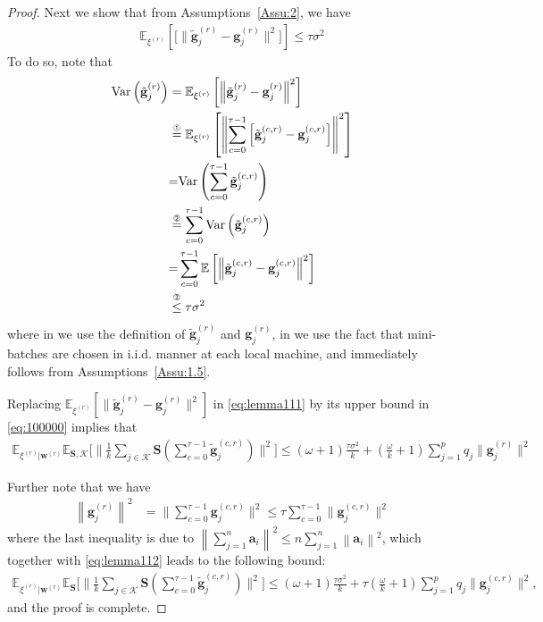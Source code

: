 \documentclass[twoside]{article}
\begin{document}
\begin{proof}
Next we show that from Assumptions~\ref{Assu:2}, we have 
\begin{align}\label{eq:100000}
    \mathbb{E}_{\xi^{(r)}}\left[\Big[\|{\tilde{\mathbf{g}}_j^{(r)}}-{\mathbf{g}_j^{(r)}}\|^2\Big]\right]\leq \tau \sigma^2
\end{align}
To do so, note that 
\begin{align}
    \text{Var}\left(\tilde{\mathbf{g}}_{j}^{(r)}\right)&=\mathbb{E}_{\xi^{(r)}}\left[\left\|{\tilde{\mathbf{g}}_j^{(r)}}-{\mathbf{g}_j^{(r)}}\right\|^2\right]\nonumber\\
    &\stackrel{\text{\ding{192}}}{=}\mathbb{E}_{\xi^{(r)}}\left[\left\|\sum_{c=0}^{\tau-1}\left[\tilde{\mathbf{g}}_j^{(c,r)}-\mathbf{g}_j^{(c,r)}\right]\right\|^2\right]\nonumber\\
    &{=}\text{Var}\left(\sum_{c=0}^{\tau-1}\tilde{\mathbf{g}}_j^{(c,r)}\right)\nonumber\\
    &\stackrel{\text{\ding{193}}}{=}\sum_{c=0}^{\tau-1}\text{Var}\left(\tilde{\mathbf{g}}_j^{(c,r)}\right)\nonumber\\
    &{=}\sum_{c=0}^{\tau-1}\mathbb{E}\left[\left\|\tilde{\mathbf{g}}_j^{(c,r)}-\mathbf{g}_j^{(c,r)}\right\|^2\right]\nonumber\\
    &\stackrel{\text{\ding{194}}}{\leq}\tau\sigma^2\label{eq:var_b_mid}
    \end{align}
where in  we use the definition of ${\tilde{\mathbf{g}}}_j^{(r)}$ and ${{\mathbf{g}}}_j^{(r)}$, in  we use the fact that mini-batches are chosen in i.i.d. manner at each local machine, and  immediately follows from Assumptions~\ref{Assu:1.5}.

Replacing $\mathbb{E}_{\xi^{(r)}}\left[\|{\tilde{\mathbf{g}}_j^{(r)}}-{\mathbf{g}_j^{(r)}}\|^2\right]$ in \eqref{eq:lemma111} by its upper bound in \eqref{eq:100000} implies that 
\begin{align}
\mathbb{E}_{{\xi^{(r)}|\boldsymbol{w}^{(r)}}}\mathbb{E}_{\mathbf{S},\mathcal{K}}\Big[\|\frac{1}{k}\sum_{j\in\mathcal{K}} \mathbf{S}\left(\sum_{c=0}^{\tau-1}\tilde{\mathbf{g}}^{(c,r)}_j\right)\|^2\Big]
\leq (\omega+1)\frac{\tau\sigma^2}{k}+(\frac{\omega}{k}+1)\sum_{j=1}^pq_j\|{\mathbf{g}}_{j}^{(r)}\|^2\label{eq:lemma112}
\end{align}

Further note that we have 
\begin{align}
\left\|{\mathbf{g}}_j^{(r)}\right\|^2&=\|\sum_{c=0}^{\tau-1}\mathbf{g}_j^{(c,r)}\|^2\stackrel{}{\leq} \tau\sum_{c=0}^{\tau-1}\|\mathbf{g}_j^{(c,r)}\|^2\label{eq:mid-bounding-absg}
\end{align} 
where the last inequality is due to $\left\|\sum_{j=1}^n\mathbf{a}_i\right\|^2\leq n\sum_{j=1}^n\left\|\mathbf{a}_i\right\|^2$, which together with \eqref{eq:lemma112} leads to the following bound:
\begin{align}
    \mathbb{E}_{{\xi^{(r)}|\boldsymbol{w}^{(r)}}}\mathbb{E}_{\mathbf{S}}\Big[\|\frac{1}{k}\sum_{j\in\mathcal{K}} \mathbf{S}\left(\sum_{c=0}^{\tau-1}\tilde{\mathbf{g}}^{(c,r)}_j\right)\|^2\Big]\leq(\omega+1)\frac{\tau\sigma^2}{k}+\tau(\frac{\omega}{k}+1)\sum_{j=1}^pq_j\|{\mathbf{g}}_{j}^{(c,r)}\|^2,
\end{align}
and the proof is complete.
\end{proof}
\end{document}
